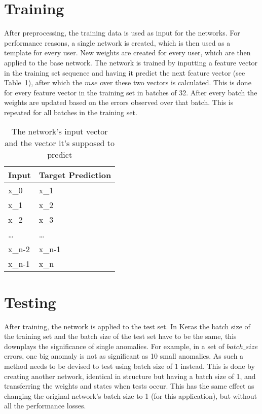 \section{Training}
After preprocessing, the training data is used as input for the networks. For performance reasons, a single network is created, which is then used as a template for every user. New weights are created for every user, which are then applied to the base network. The network is trained by inputting a feature vector in the training set sequence and having it predict the next feature vector (see Table~\ref{tab:training_set_shift}), after which the \(mse\) over these two vectors is calculated. This is done for every feature vector in the training set in batches of 32. After every batch the weights are updated based on the errors observed over that batch. This is repeated for all batches in the training set.

\begin{table}[]
	\centering
	\caption{The network's input vector and the vector it's supposed to predict}\label{tab:training_set_shift}
	\begin{tabular}{ll}
		Input & Target Prediction \\ \hline
		x_0    & x_1                \\
		x_1    & x_2                \\
		x_2    & x_3                \\
		\dots   & \dots               \\
		x_{n-2}  & x_{n-1}              \\
		x_{n-1}  & x_n               
	\end{tabular}
\end{table}

\section{Testing}\label{sec:methods:testing}
After training, the network is applied to the test set. In Keras the batch size of the training set and the batch size of the test set have to be the same, this downplays the significance of single anomalies. For example, in a set of \(batch\_size\) errors, one big anomaly is not as significant as 10 small anomalies. As such a method needs to be devised to test using batch size of 1 instead. This is done by creating another network, identical in structure but having a batch size of 1, and transferring the weights and states when tests occur. This has the same effect as changing the original network's batch size to 1 (for this application), but without all the performance losses.

